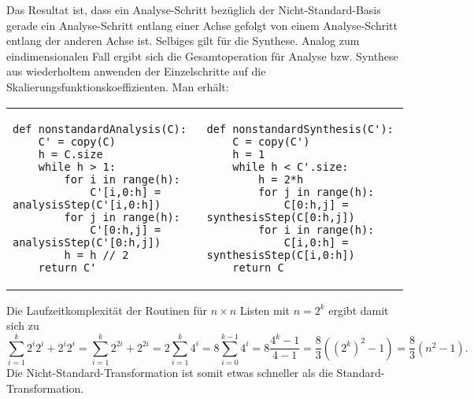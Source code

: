 %
Das Resultat ist, dass ein Analyse-Schritt bezüglich der Nicht-Standard-Basis gerade ein Analyse-Schritt entlang einer Achse gefolgt von einem Analyse-Schritt entlang der anderen Achse ist. Selbiges gilt für die Synthese. Analog zum eindimensionalen Fall ergibt sich die Gesamtoperation für Analyse bzw. Synthese aus wiederholtem anwenden der Einzelschritte auf die Skalierungsfunktionskoeffizienten. Man erhält:

\begin{adjustbox}{max width=\textwidth ,center}
\begin{tabular}{p{}|p{}}
\begin{verbatim}
def nonstandardAnalysis(C):
    C' = copy(C)
    h = C.size
    while h > 1:
        for i in range(h):
            C'[i,0:h] = analysisStep(C'[i,0:h])
        for j in range(h):
            C'[0:h,j] = analysisStep(C'[0:h,j])
        h = h // 2
    return C'
\end{verbatim}
&
\begin{verbatim}
def nonstandardSynthesis(C'):
    C = copy(C')
    h = 1
    while h < C'.size:
        h = 2*h
        for j in range(h):
            C[0:h,j] = synthesisStep(C[0:h,j])
        for i in range(h):
            C[i,0:h] = synthesisStep(C[i,0:h])
    return C
\end{verbatim}
\\
\end{tabular}
\end{adjustbox}

\noindent Die Laufzeitkomplexität der Routinen für $n \times n$ Listen mit $n=2^k$ ergibt damit sich zu 
%
\[
\sum_{i=1}^k 2^i 2^i + 2^i 2^i
= \sum_{i=1}^k 2^{2i} + 2^{2i} 
= 2\sum_{i=1}^k 4^i 
= 8\sum_{i=0}^{k-1} 4^i 
= 8\frac{4^k-1}{4-1} 
= \frac{8}{3}((2^k)^2-1) 
= \frac{8}{3}(n^2-1)
.
\]
%
Die Nicht-Standard-Transformation ist somit etwas schneller als die Standard-Transformation.
%
